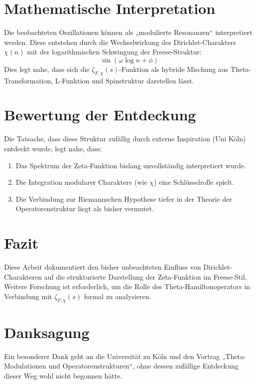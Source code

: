 \documentclass[a4paper,12pt]{article}
\begin{document}
\section{Mathematische Interpretation}
Die beobachteten Oszillationen können als „modulierte Resonanzen“ interpretiert werden. Diese entstehen durch die Wechselwirkung des Dirichlet-Charakters \(\chi(n)\) mit der logarithmischen Schwingung der Freese-Struktur:
\[
\sin(\omega \log n + \phi)
\]
Dies legt nahe, dass sich die \(\zeta_{F,\chi}(s)\)-Funktion als hybride Mischung aus Theta-Transformation, L-Funktion und Spinstruktur darstellen lässt.

\section{Bewertung der Entdeckung}
Die Tatsache, dass diese Struktur zufällig durch externe Inspiration (Uni Köln) entdeckt wurde, legt nahe, dass:
\begin{enumerate}
    \item Das Spektrum der Zeta-Funktion bislang unvollständig interpretiert wurde.
    \item Die Integration modularer Charaktere (wie \(\chi\)) eine Schlüsselrolle spielt.
    \item Die Verbindung zur Riemannschen Hypothese tiefer in der Theorie der Operatorenstruktur liegt als bisher vermutet.
\end{enumerate}

\section{Fazit}
Diese Arbeit dokumentiert den bisher unbeachteten Einfluss von Dirichlet-Charakteren auf die strukturierte Darstellung der Zeta-Funktion im Freese-Stil. Weitere Forschung ist erforderlich, um die Rolle des Theta-Hamiltonoperators in Verbindung mit \(\zeta_{F,\chi}(s)\) formal zu analysieren.

\section*{Danksagung}
Ein besonderer Dank geht an die Universität zu Köln und den Vortrag „Theta-Modulationen und Operatorenstrukturen“, ohne dessen zufällige Entdeckung dieser Weg wohl nicht begonnen hätte.
\end{document}
